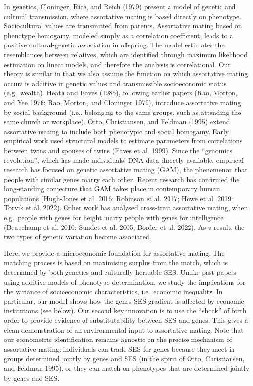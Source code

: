 \documentclass[
  12pt,
]{article}
\theoremstyle{definition}
\theoremstyle{definition}
\theoremstyle{definition}
\theoremstyle{definition}
\theoremstyle{remark}
\begin{document}
In genetics, Cloninger, Rice, and Reich (1979) present a model of genetic and cultural
transmission, where assortative mating is based directly on phenotype.
Sociocultural values are transmitted from parents. Assortative mating based on
phenotype homogamy, modeled simply as a correlation coefficient, leads to a
positive cultural-genetic association in offspring. The model estimates the
resemblances between relatives, which are identified through maximum
likelihood estimation on linear models, and therefore the analysis is
correlational. Our theory is similar in that we also assume the function on
which assortative mating occurs is additive in genetic values and
transmissible socioeconomic status (e.g.~wealth). Heath and Eaves (1985), following earlier papers (Rao, Morton, and Yee 1976; Rao, Morton, and Cloninger 1979), introduce
assortative mating by social background (i.e., belonging to the same groups,
such as attending the same church or workplace).
Otto, Christiansen, and Feldman (1995) extend assortative mating to include both phenotypic and social
homogamy. Early empirical work used structural models to estimate parameters from
correlations between twins and spouses of twins (Eaves et al. 1999). Since the
``genomics revolution'', which has made individuals' DNA data directly available,
empirical research has focused on genetic assortative mating (GAM), the
phenomenon that people with similar genes marry each other. Recent research has
confirmed the long-standing conjecture that GAM takes place in contemporary human
populations (Hugh-Jones et al. 2016; Robinson et al. 2017; Howe et al. 2019; Torvik et al. 2022). Other work has analysed cross-trait assortative mating,
when e.g.~people with genes for height marry people with genes for intelligence
(Beauchamp et al. 2010; Sundet et al. 2005; Border et al. 2022). As a result, the two types of
genetic variation become associated.

Here, we provide a microeconomic foundation for assortative mating. The
matching process is based on maximising surplus from the match, which is
determined by both genetics and culturally heritable SES. Unlike past papers using
additive models of phenotype determination, we study the implications for
the variance of socioeconomic characteristics, i.e.~economic inequality.
In particular, our model shows how
the genes-SES gradient is affected by economic institutions (see below).
Our second key innovation is to use the ``shock'' of birth order to provide
evidence of substitutability between SES and genes. This gives a clean
demonstration of an environmental input to assortative mating.
Note that our econometric identification remains agnostic on the precise
mechanism of assortative mating: individuals can trade SES for genes because they
meet in groups determined jointly by genes and SES (in the spirit of Otto, Christiansen, and Feldman 1995), or they can match on phenotypes that are determined jointly by
genes and SES.
\end{document}
